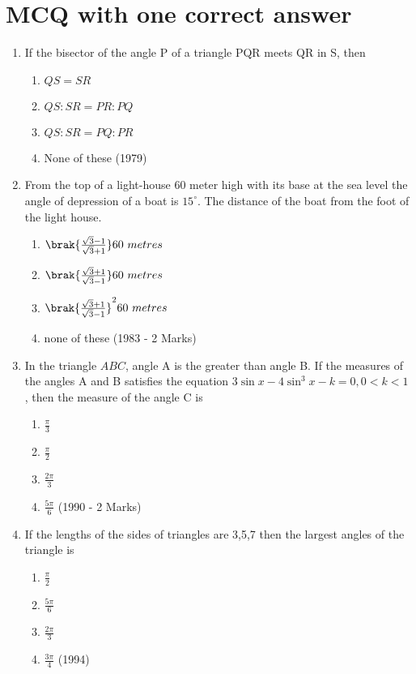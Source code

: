 \documentclass[journal,12pt,twocolumn]{IEEEtran}
\theoremstyle{remark}
\begin{document}
\section{MCQ with one correct answer}
\begin{enumerate}
    \item If the bisector of the angle P of a triangle PQR meets QR in S, then
    \begin{enumerate}[label = (\alph*)]
        \item $QS = SR$
        \item $QS : SR = PR : PQ$
        \item $QS : SR = PQ : PR$
        \item None of these \hfill (1979)
    \end{enumerate}
    \item From the top of a light-house 60 meter high with its base at the sea level the angle of depression of a boat is  $15^\circ$. The distance of the boat from the foot of the light house.
    \begin{enumerate}[label = (\alph*)]
    \item $\brak{\frac{\sqrt{3}-1}{\sqrt{3}+1}}60\ metres $
    \item $\brak{\frac{\sqrt{3}+1}{\sqrt{3}-1}}60\ metres $
    \item $\brak{\frac{\sqrt{3}+1}{\sqrt{3}-1}}^2 60\ metres $
    \item none of these \hfill (1983 - 2 Marks)
\end{enumerate}
    \item In the triangle $ABC$, angle A is the greater than angle B. If the measures of the angles A and B satisfies the equation $3\sin x - 4 \sin^3 x - k = 0, 0<k<1$ , then the measure of the angle C is 
     \begin{enumerate}[label = (\alph*)]
     \item $\frac{\pi}{3}$
     \item $\frac{\pi}{2}$
     \item $\frac{2\pi}{3}$
     \item $\frac{5\pi}{6}$ \hfill (1990 - 2 Marks)
\end{enumerate}
    \item If the lengths of the sides of triangles are 3,5,7 then the largest angles of the triangle is
    \begin{enumerate}[label = (\alph*)]
     \item $\frac{\pi}{2}$
     \item $\frac{5\pi}{6}$
     \item $\frac{2\pi}{3}$
     \item $\frac{3\pi}{4}$ \hfill (1994)
\end{enumerate}

\end{enumerate}
\end{document}
